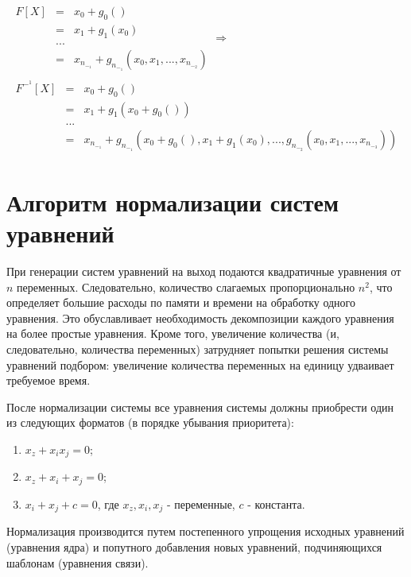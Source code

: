 \begin{equation}\begin{multlined}
\begin{array} {lcl} 
F[X] & = & x_0+g_0() 
  \\ & = & x_1+g_1(x_0)
  \\ & ...
  \\ & = & x_n_-_1+g_n_-_1(x_0,x_1,...,x_n_-_2)
\end{array}
\Rightarrow \\
\begin{array} {lcl} 
F^-^1[X] & = & x_0+g_0() 
      \\ & = & x_1+g_1(x_0+g_0())
      \\ & ...
      \\ & = & x_n_-_1+g_n_-_1(x_0+g_0(),x_1+g_1(x_0),...,g_n_-_2(x_0,x_1,...,x_n_-_3))
\end{array}
\end{multlined}\end{equation}


\section{Алгоритм нормализации систем уравнений}
При генерации систем уравнений на выход подаются квадратичные уравнения от \(n\) переменных. Следовательно, количество слагаемых пропорционально \(n^2\), что определяет большие расходы по памяти и времени на обработку одного уравнения. Это обуславливает необходимость декомпозиции каждого уравнения на более простые уравнения. Кроме того, увеличение количества (и, следовательно, количества переменных) затрудняет попытки решения системы уравнений подбором: увеличение количества переменных на единицу удваивает требуемое время.

После нормализации системы все уравнения системы должны приобрести один из следующих форматов (в порядке убывания приоритета):

\begin{enumerate}
	\item \(x_z+x_ix_j=0\);
	\item \(x_z+x_i+x_j=0\);
	\item \(x_i+x_j+c=0\), где \(x_z, x_i, x_j\) - переменные, \(c\) - константа.
\end{enumerate} 

Нормализация производится путем постепенного упрощения исходных уравнений (уравнения ядра) и попутного добавления новых уравнений, подчиняющихся шаблонам (уравнения связи).

